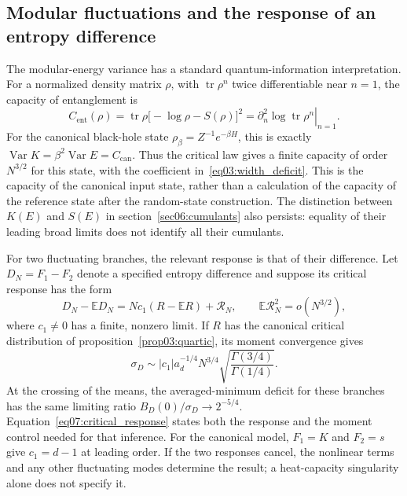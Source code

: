 \documentclass[11pt,letterpaper]{article}
\newcommand{\E}{\mathbb{E}}
\DeclareMathOperator{\Var}{Var}
\DeclareMathOperator{\tr}{tr}
\theoremstyle{plain}
\theoremstyle{definition}
\theoremstyle{remark}
\begin{document}
\subsection{Modular fluctuations and the response of an entropy difference}
\label{sec07:response}

The modular-energy variance has a standard quantum-information interpretation. For a normalized density matrix $\rho$, with $\tr\rho^n$ twice differentiable near $n=1$, the capacity of entanglement is~\cite{deboer2019}
\begin{equation}
 C_{\mathrm{ent}}(\rho)
 =\tr\rho\bigl[-\log\rho-S(\rho)\bigr]^2
 =\left.\partial_n^2\log\tr\rho^n\right|_{n=1}.
 \label{eq07:capacity}
\end{equation}
For the canonical black-hole state $\rho_\beta=Z^{-1}e^{-\beta H}$, this is exactly $\Var K=\beta^2\Var E=C_{\mathrm{can}}$. Thus the critical law gives a finite capacity of order $N^{3/2}$ for this state, with the coefficient in~\eqref{eq03:width_deficit}. This is the capacity of the canonical input state, rather than a calculation of the capacity of the reference state after the random-state construction. The distinction between $K(E)$ and $S(E)$ in section~\ref{sec06:cumulants} also persists: equality of their leading broad limits does not identify all their cumulants.

For two fluctuating branches, the relevant response is that of their difference. Let $D_N=F_1-F_2$ denote a specified entropy difference and suppose its critical response has the form
\begin{equation}
 D_N-\E D_N=Nc_1(R-\E R)+\mathcal R_N,
 \qquad \E\mathcal R_N^2=o(N^{3/2}),
 \label{eq07:critical_response}
\end{equation}
where $c_1\neq0$ has a finite, nonzero limit. If $R$ has the canonical critical distribution of proposition~\ref{prop03:quartic}, its moment convergence gives
\begin{equation}
 \sigma_D\sim |c_1|a_d^{-1/4}N^{3/4}
 \sqrt{\frac{\Gamma(3/4)}{\Gamma(1/4)}}.
 \label{eq07:projected_width}
\end{equation}
At the crossing of the means, the averaged-minimum deficit for these branches has the same limiting ratio $B_D(0)/\sigma_D\to2^{-5/4}$. Equation~\eqref{eq07:critical_response} states both the response and the moment control needed for that inference. For the canonical model, $F_1=K$ and $F_2=s$ give $c_1=d-1$ at leading order. If the two responses cancel, the nonlinear terms and any other fluctuating modes determine the result; a heat-capacity singularity alone does not specify it.
\end{document}
